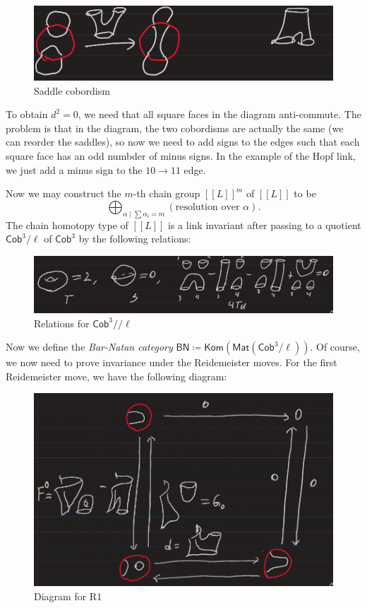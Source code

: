 \documentclass[leqno, openany]{memoir}
\theoremstyle{definition}
\theoremstyle{remark}
\theoremstyle{plain}
\theoremstyle{definition}
\theoremstyle{remark}
\newcommand{\ms}[1]{\mathsf{#1}}
\newcommand{\1}{\mathbf{1}}
\newcommand{\2}{\mathbf{2}}
\newcommand{\3}{\mathbf{3}}
\begin{document}
\begin{figure}[H]
    \centering
    \includegraphics[width=0.8\linewidth]{seb3.png}
    \caption{Saddle cobordism}%
    \label{fig:seb2}
\end{figure}

To obtain $d^2 = 0$, we need that all square faces in the diagram anti-commute. The problem is that in the diagram, the two cobordisms are actually the same (we can reorder the saddles), so now we need to add signs to the edges such that each square face has an odd numbder of minus signs. In the example of the Hopf link, we just add a minus sign to the $10 \to 11$ edge.

Now we may construct the $m$-th chain group ${ [[L]] }^m$ of $[[L]]$ to be
\[ \bigoplus_{\alpha \mid \sum \alpha_i = m} (\text{resolution over $\alpha$}). \]
The chain homotopy type of $[[L]]$ is a link invariant after passing to a quotient $\ms{Cob}^3/\ell$ of $\ms{Cob}^3$ by the following relations:

\begin{figure}[H]
    \centering
    \includegraphics[width=0.8\linewidth]{seb5.png}
    \caption{Relations for $\ms{Cob}^3//\ell$}%
    \label{fig:seb3}
\end{figure}

Now we define the \textit{Bar-Natan category} $\ms{BN} \coloneqq \ms{Kom}(\ms{Mat}(\ms{Cob}^3/\ell))$. Of course, we now need to prove invariance under the Reidemeister moves. For the first Reidemeister move, we have the following diagram:

\begin{figure}[H]
    \centering
    \includegraphics[width=0.6\linewidth]{seb6.png}
    \caption{Diagram for R1}%
    \label{fig:seb4}
\end{figure}
\end{document}
